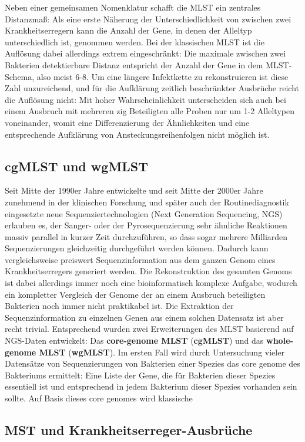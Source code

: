 Neben einer gemeinsamen Nomenklatur schafft die MLST ein zentrales Distanzmaß: Als eine erste Näherung der Unterschiedlichkeit von zwischen zwei Krankheitserregern kann die Anzahl der Gene, in denen der Alleltyp unterschiedlich ist, genommen werden. Bei der klassischen MLST ist die Auflösung dabei allerdings extrem eingeschränkt: Die maximale zwischen zwei Bakterien detektierbare Distanz entspricht der Anzahl der Gene in dem MLST-Schema, also meist 6-8. Um eine längere Infektkette zu rekonstruieren ist diese Zahl unzureichend, und für die Aufklärung zeitlich beschränkter Ausbrüche reicht die Auflösung nicht: Mit hoher Wahrscheinlichkeit unterscheiden sich auch bei einem Ausbruch mit mehreren zig Beteiligten alle Proben nur um 1-2 Alleltypen voneinander, womit eine Differenzierung der Ähnlichkeiten und eine entsprechende Aufklärung von Ansteckungsreihenfolgen nicht möglich ist.  

\subsection{cgMLST und wgMLST}

Seit Mitte der 1990er Jahre entwickelte und seit Mitte der 2000er Jahre zunehmend in der klinischen Forschung und später auch der Routinediagnostik eingesetzte neue Sequenziertechnologien (Next Generation Sequencing, NGS) erlauben es, der Sanger- oder der Pyrosequenzierung sehr ähnliche Reaktionen massiv parallel in kurzer Zeit durchzuführen, so dass sogar mehrere Milliarden Sequenzierungen gleichzeitig durchgeführt werden können. Dadurch kann vergleichsweise preiswert Sequenzinformation aus dem ganzen Genom eines Krankheitserregers generiert werden. Die Rekonstruktion des gesamten Genoms ist dabei allerdings immer noch eine bioinformatisch komplexe Aufgabe, wodurch ein kompletter Vergleich der Genome der an einem Ausbruch beteiligten Bakterien noch immer nicht praktikabel ist. Die Extraktion der Sequenzinformation zu einzelnen Genen aus einem solchen Datensatz ist aber recht trivial. Entsprechend wurden zwei Erweiterungen des MLST basierend auf NGS-Daten entwickelt: Das \textbf{core-genome MLST} (\textbf{cgMLST}) und das \textbf{whole-genome MLST} (\textbf{wgMLST}). Im ersten Fall wird durch Untersuchung vieler Datensätze von Sequenzierungen von Bakterien einer Spezies das core genome des Bakteriums ermittelt: Eine Liste der Gene, die für Bakterien dieser Spezies essentiell ist und entsprechend in jedem Bakterium dieser Spezies vorhanden sein sollte. Auf Basis dieses core genomes wird klassische

\subsection{MST und Krankheitserreger-Ausbrüche}
